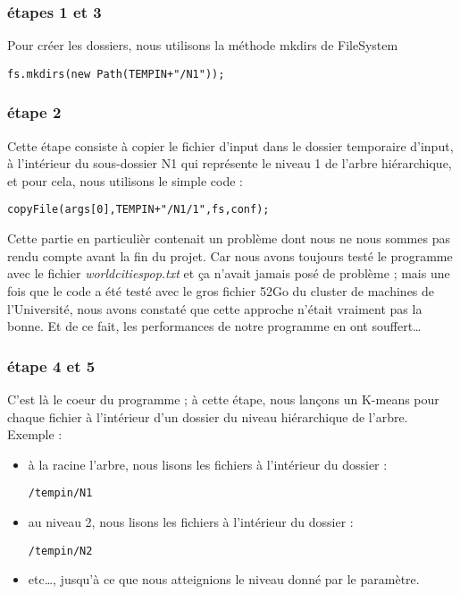 \documentclass[12pt]{article}
\begin{document}
\subsubsection{étapes 1 et 3}
\label{sec:org278f684}

Pour créer les dossiers, nous utilisons la méthode mkdirs de FileSystem

\begin{verbatim}
fs.mkdirs(new Path(TEMPIN+"/N1"));
\end{verbatim}

\subsubsection{étape 2}
\label{sec:org4cebcfd}

Cette étape consiste à copier le fichier d'input dans le dossier temporaire d'input, à l'intérieur du sous-dossier N1 qui représente le 
niveau 1 de l'arbre hiérarchique, et pour cela, nous utilisons le simple code : 

\begin{verbatim}
copyFile(args[0],TEMPIN+"/N1/1",fs,conf);
\end{verbatim}

  Cette partie en particulièr contenait un problème dont nous ne nous sommes pas rendu compte avant la fin du projet. Car nous avons toujours
testé le programme avec le fichier \emph{worldcitiespop.txt} et ça n'avait jamais posé de problème ; mais une fois que le code a été testé avec 
le gros fichier 52Go du cluster de machines de l'Université, nous avons constaté que cette approche n'était vraiment pas la bonne. 
Et de ce fait, les performances de notre programme en ont souffert\ldots{} 

\subsubsection{étape 4 et 5}
\label{sec:org6f965fa}
C'est là le coeur du programme ; à cette étape, nous lançons un K-means pour chaque fichier à l'intérieur d'un dossier du niveau
hiérarchique de l'arbre. Exemple : 

\begin{itemize}
\item à la racine l'arbre, nous lisons les fichiers à l'intérieur du dossier : 

\begin{verbatim}
/tempin/N1
\end{verbatim}

\item au niveau 2, nous lisons les fichiers à l'intérieur du dossier :

\begin{verbatim}
/tempin/N2
\end{verbatim}

\item etc\ldots{}, jusqu'à ce que nous atteignions le niveau donné par le paramètre.
\end{itemize}
\end{document}
